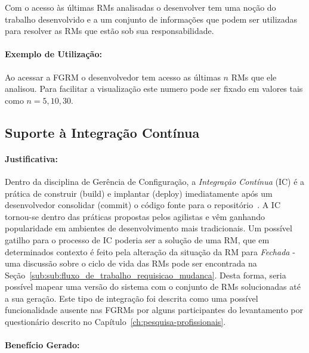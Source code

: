 Com o acesso às últimas RMs analisadas o desenvolver tem uma noção do trabalho
desenvolvido e a um conjunto de informações que podem ser utilizadas para
resolver as RMs que estão sob sua responsabilidade.

\paragraph{Exemplo de Utilização:}
\label{par:exemplo_de_utilização_s04}

Ao acessar a FGRM o desenvolvedor tem acesso as últimas $n$ RMs que ele
analisou. Para facilitar a visualização este numero pode ser fixado em valores
tais como $n = {5, 10, 30}$.

\subsection{Suporte à Integração Contínua}
\label{sub:suporte_integracao_continua}


\paragraph{Justificativa:}
\label{par:justificativa_s05}

Dentro da disciplina de Gerência de Configuração, a \textit{Integração
    Contínua} (IC) é a prática de construir (build) e implantar (deploy)
imediatamente após um desenvolvedor consolidar (commit) o código fonte para o
repositório~\cite{aiello2010configuration}. A IC tornou-se dentro das práticas
propostas pelos agilistas e vêm ganhando popularidade em ambientes de
desenvolvimento mais tradicionais. Um possível gatilho para o processo de IC
poderia ser a solução de uma RM, que em determinados contexto é feito pela
alteração da situação da RM para \textit{Fechada} \@-\@ uma discussão sobre o
ciclo de vida das RMs pode ser encontrada na
Seção~\ref{sub:sub:fluxo_de_trabalho_requisicao_mudanca}. Desta forma, seria
possível mapear uma versão do sistema com o conjunto de RMs solucionadas até a
sua geração. Este tipo de integração foi descrita como uma possível
funcionalidade ausente nas FGRMs por alguns participantes do levantamento por
questionário descrito no Capítulo~\ref{ch:pesquisa-profissionais}.

\paragraph{Benefício Gerado:}
\label{par:papéis_afetados_s05}

